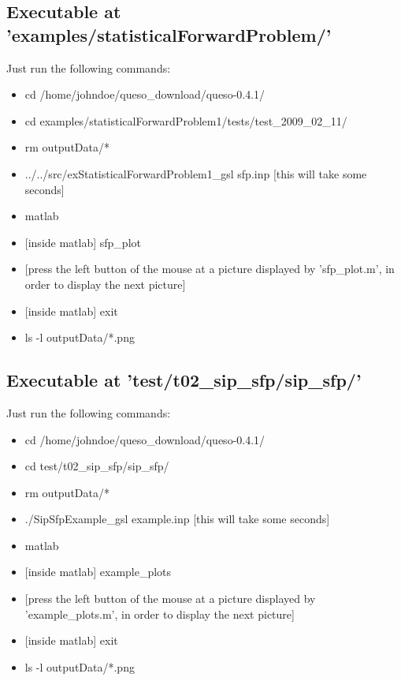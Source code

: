 \subsection{Executable at 'examples/statisticalForwardProblem/'}

Just run the following commands:
\begin{itemize}
\item cd /home/johndoe/queso\_download/queso-0.4.1/
\item cd examples/statisticalForwardProblem1/tests/test\_2009\_02\_11/
\item rm outputData/*
\item ../../src/exStatisticalForwardProblem1\_gsl sfp.inp [this will take some seconds]
\item matlab
\item {[inside matlab] sfp\_plot}
\item {[press the left button of the mouse at a picture displayed by 'sfp\_plot.m', in order to display the next picture]}
\item {[inside matlab]} exit
\item ls -l outputData/*.png
\end{itemize}



\subsection{Executable at 'test/t02\_sip\_sfp/sip\_sfp/'}\label{subsc-t02}

Just run the following commands:
\begin{itemize}
\item cd /home/johndoe/queso\_download/queso-0.4.1/
\item cd test/t02\_sip\_sfp/sip\_sfp/
\item rm outputData/*
\item ./SipSfpExample\_gsl example.inp [this will take some seconds]
\item matlab
\item {[inside matlab]} example\_plots
\item {[press the left button of the mouse at a picture displayed by 'example\_plots.m', in order to display the next picture]}
\item {[inside matlab]} exit
\item ls -l outputData/*.png
\end{itemize}

